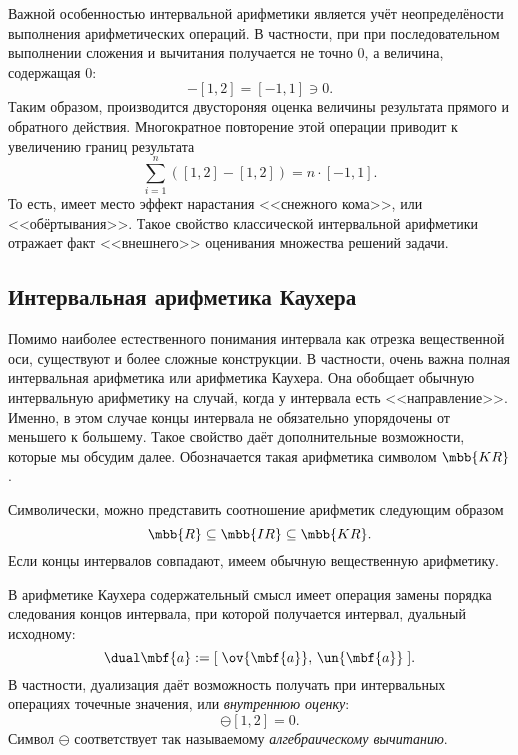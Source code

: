 \documentclass[a5paper,openany]{book}
\begin{document}
Важной особенностью интервальной арифметики является учёт неопределёности выполнения арифметических операций. В частности, при при последовательном выполнении сложения и вычитания получается не точно 0, а величина, содержащая 0:
\begin{equation*} 
[1,2]-[1,2] = [-1,1] \ni 0.
\end{equation*}
Таким образом, производится двустороняя оценка величины результата прямого и обратного действия. Многократное повторение этой операции приводит к увеличению границ результата
\begin{equation*} 
\sum_{i=1}^{n} \left(  [1,2]-[1,2] \right) = n \cdot [-1,1].
\end{equation*}
То есть, имеет место эффект нарастания <<снежного кома>>, или <<обёртывания>>. Такое свойство классической интервальной арифметики отражает факт <<внешнего>> оценивания множества решений задачи.  

\subsection{Интервальная арифметика Каухера}

Помимо наиболее естественного понимания интервала как отрезка вещественной оси, существуют и более сложные конструкции. В частности, очень важна полная интервальная арифметика или арифметика Каухера. Она обобщает обычную интервальную арифметику на случай, когда у интервала есть <<направление>>. Именно, в этом случае концы интервала не обязательно упорядочены от меньшего к большему. Такое свойство даёт дополнительные возможности, которые мы обсудим далее. Обозначается такая арифметика символом $\mbb{KR}$. 

Символически, можно представить соотношение арифметик следующим образом
$$ \mbb{R} \subseteq \mbb{IR} \subseteq \mbb{KR}. $$
Если концы интервалов совпадают, имеем обычную вещественную арифметику.

В арифметике Каухера содержательный смысл имеет операция замены порядка следования концов интервала, при которой получается интервал, дуальный исходному: 
\begin{equation*}
\label{Dualization}
\dual\mbf{a} := [\;\ov{\mbf{a}},\,\un{\mbf{a}}\;].
\end{equation*}
В частности, дуализация даёт возможность получать при интервальных операциях точечные значения, или \emph{внутреннюю оценку}:
\begin{equation*}
[1,2] \ominus [1,2]=0.
\end{equation*}
Символ $\ominus$ соответствует так называемому \emph{алгебраическому вычитанию}.  
\end{document}

